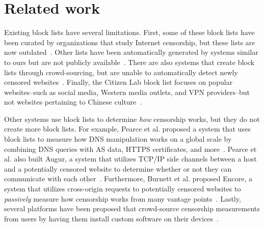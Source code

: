 
\section{Related work}
Existing block lists have several limitations. First, some of these
block lists have been curated by organizations that study Internet
censorship, but these lists are now
outdated~\cite{chinadigitaltimes,oni}. Other lists have been automatically
generated by systems similar to ours but are not publicly
available~\cite{sfakianakis2011censmon}. There are also systems that
create block lists through crowd-sourcing, but are unable to
automatically detect newly censored websites~\cite{herdict,
greatfire}. Finally, the Citizen Lab block list focuses on popular
websites--such as social media, Western media outlets, and VPN
providers--but not websites pertaining to Chinese
culture~\cite{citizenlab:block}.

Other systems use block lists to determine \textit{how} censorship
works, but they do not create more block lists. For example, Pearce
et al. proposed a system that uses block lists to measure how DNS
manipulation works on a global scale by combining DNS queries with AS
data, HTTPS certificates, and more~\cite{pearce2017global}. Pearce
et al. also built Augur, a system that utilizes TCP/IP side channels
between a host and a potentially censored website to determine whether
or not they can communicate with each
other~\cite{pearce2017augur}. Furthermore, Burnett et al. proposed
Encore, a system that utilizes cross-origin requests to potentially
censored websites to \textit{passively} measure how censorship works
from many vantage points~\cite{burnett:encore}. Lastly, several
platforms have been proposed that crowd-source censorship measurements
from users by having them install custom software on their
devices~\cite{razaghpanah2016exploring, ooni:about, iclab}.
